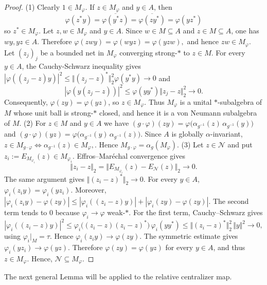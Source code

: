 \documentclass[12pt]{amsart} %
\theoremstyle{plain}
\theoremstyle{definition}
\begin{document}
\begin{proof}
(1) Clearly $1\in M_\varphi$. If $z\in M_\varphi$ and
$y\in A$, then
$$
\varphi(z^*y)
=\overline{\varphi(y^*z)}
=\overline{\varphi(zy^*)}
=\varphi(yz^*)$$ so $z^*\in M_\varphi$. Let $z,w\in M_\varphi$ and $y\in A$. Since
$w\in M\subseteq A$ and $z\in M\subseteq A$, one has
$wy,yz\in A$. Therefore
$
\varphi(zwy)
=\varphi(wyz)
=\varphi(yzw),
$ and hence $zw\in M_\varphi$. Let $(z_j)_j$ be a bounded net in $M_\varphi$ converging strong-$*$
to $z\in M$. For every $y\in A$, the Cauchy-Schwarz inequality gives
$
|\varphi((z_j-z)y)|^2
\leq
\Vert(z_j-z)^*\Vert_2^2\varphi(y^*y)\longrightarrow0
$
and
$$
|\varphi(y(z_j-z))|^2
\leq
\varphi(yy^*)\Vert z_j-z\Vert_2^2\longrightarrow0.
$$
Consequently, $\varphi(zy)=\varphi(yz)$, so
$z\in M_\varphi$. Thus $M_\varphi$ is a unital
$*$-subalgebra of $M$ whose unit ball is strong-$*$ closed, and
hence it is a von Neumann subalgebra of $M$.
\medskip
\noindent(2) For $z\in M$ and $y\in A$ we have $(g\cdot\varphi)(zy)=\varphi\bigl(\alpha_{g^{-1}}(z)\,\alpha_{g^{-1}}(y)\bigr)$ and $(g\cdot\varphi)(yz)=\varphi\bigl(\alpha_{g^{-1}}(y)\,\alpha_{g^{-1}}(z)\bigr)$. Since $A$ is globally $\alpha$-invariant, $z\in M_{g\cdot\varphi}
\Leftrightarrow
\alpha_{g^{-1}}(z)\in M_\varphi,
$. Hence
$M_{g\cdot\varphi}=\alpha_g(M_\varphi)$.
\medskip
\noindent(3) Let $z\in\mathcal N$ and put $z_i:=E_{M_{\varphi_i}}(z)\in M_{\varphi_i}$. Effros--Mar\'echal convergence gives
$$
\Vert z_i-z\Vert_2=\Vert E_{M_{\varphi_i}}(z)-E_{\mathcal{N}}(z)\Vert_2
\to
0.
$$
The same argument gives $\Vert(z_i-z)^*\Vert_2\longrightarrow0$.
For every $y\in A$, $\varphi_i(z_iy)=\varphi_i(yz_i)$. Moreover, $|\varphi_i(z_iy)-\varphi(zy)|\leq|\varphi_i((z_i-z)y)|+|\varphi_i(zy)-\varphi(zy)|$. The second term tends to $0$ because $\varphi_i\to\varphi$ weak-$*$. For the first term, Cauchy--Schwarz gives
$$|\varphi_i((z_i-z)y)|^2\leq\varphi_i\bigl((z_i-z)(z_i-z)^*\bigr)\,\varphi_i(yy^*)\leq\Vert(z_i-z)^*\Vert_2^2\,\Vert y\Vert^2\longrightarrow0,$$
using $\varphi_i|_{M}=\tau$. Hence
$\varphi_i(z_iy)\to\varphi(zy)$. The symmetric estimate gives
$\varphi_i(yz_i)\to\varphi(yz)$. Therefore
$\varphi(zy)=\varphi(yz)$ for every $y\in A$, and thus
$z\in M_\varphi$. Hence,
$\mathcal N\subseteq M_\varphi$.
\end{proof}
\noindent The next general Lemma will be applied to the relative centralizer map.
\end{document}
